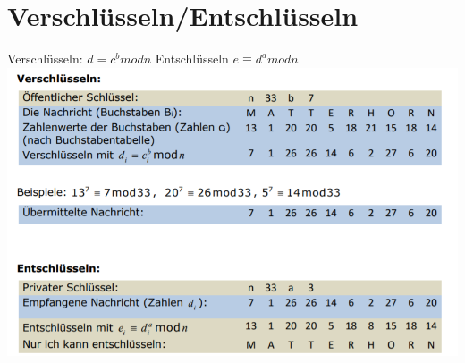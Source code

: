 \documentclass{article}
\begin{document}
\section{Verschlüsseln/Entschlüsseln}
Verschlüsseln: \(d=c^{b} mod n\) Entschlüsseln \(e \equiv d^{a} mod n\)\\
\includegraphics[scale=.5]{rsa.PNG}
\end{document}
